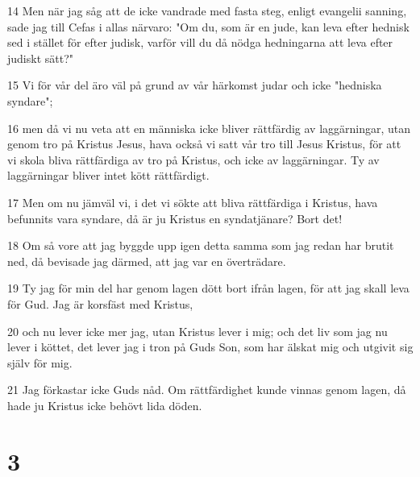\par 14 Men när jag såg att de icke vandrade med fasta steg, enligt evangelii sanning, sade jag till Cefas i allas närvaro: "Om du, som är en jude, kan leva efter hednisk sed i stället för efter judisk, varför vill du då nödga hedningarna att leva efter judiskt sätt?"
\par 15 Vi för vår del äro väl på grund av vår härkomst judar och icke "hedniska syndare";
\par 16 men då vi nu veta att en människa icke bliver rättfärdig av laggärningar, utan genom tro på Kristus Jesus, hava också vi satt vår tro till Jesus Kristus, för att vi skola bliva rättfärdiga av tro på Kristus, och icke av laggärningar. Ty av laggärningar bliver intet kött rättfärdigt.
\par 17 Men om nu jämväl vi, i det vi sökte att bliva rättfärdiga i Kristus, hava befunnits vara syndare, då är ju Kristus en syndatjänare? Bort det!
\par 18 Om så vore att jag byggde upp igen detta samma som jag redan har brutit ned, då bevisade jag därmed, att jag var en överträdare.
\par 19 Ty jag för min del har genom lagen dött bort ifrån lagen, för att jag skall leva för Gud. Jag är korsfäst med Kristus,
\par 20 och nu lever icke mer jag, utan Kristus lever i mig; och det liv som jag nu lever i köttet, det lever jag i tron på Guds Son, som har älskat mig och utgivit sig själv för mig.
\par 21 Jag förkastar icke Guds nåd. Om rättfärdighet kunde vinnas genom lagen, då hade ju Kristus icke behövt lida döden.

\chapter{3}

